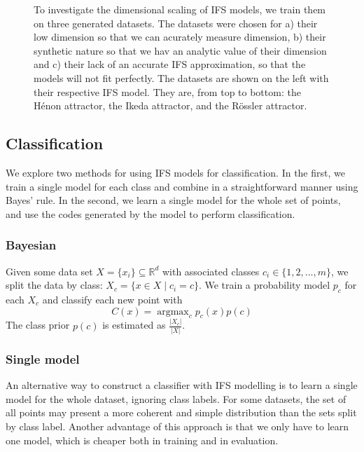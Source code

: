 \documentclass[10pt,a4paper,oneside]{article}
\theoremstyle{definition}
\DeclareMathOperator*{\argmax}{argmax}
\begin{document}
\begin{figure}[t]
\begin{subfigure}{0.33\textwidth}
\begin{tabular}{c c }
	\end{tabular}
  \end{subfigure}
  \caption{To investigate the dimensional scaling of IFS models, we train them on three generated datasets. The datasets were chosen for a) their low dimension so that we can acurately measure dimension, b) their synthetic nature so that we hav an analytic value of their dimension and c) their lack of an accurate IFS approximation, so that the models will not fit perfectly. The datasets are shown on the left with their respective IFS model. They are, from top to bottom: the H\'enon attractor, the Ikeda attractor, and the R\"ossler attractor.}
  \label{fig:dim_scale}
\end{figure}


\subsection*{Classification}

We explore two methods for using IFS models for classification. In the first, we train a single model for each class and combine in a straightforward manner using Bayes' rule. In the second, we learn a single model for the whole set of points, and use the codes generated by the model to perform classification.  

\subsubsection*{Bayesian}

Given some data set $X = \{x_i\} \subseteq {\mathbb R}^d$ with associated classes $c_i \in \{1, 2, \ldots, m\}$, we split the data by class: $X_c = \{ x \in X \mid c_i = c\}$. We train a probability model $p_c$ for each $X_c$ and classify each new point with
\[
C(x) = \argmax_{c} p_c(x) p(c)
\]
The class prior $p(c)$ is estimated as $\frac{|X_c|}{|X|}$.

\subsubsection*{Single model}

An alternative way to construct a classifier with IFS modelling is to learn a single model for the whole dataset, ignoring class labels. For some datasets, the set of all points may present a more coherent and simple distribution than the sets split by class label. Another advantage of this approach is that we only have to learn one model, which is cheaper both in training and in evaluation.
\end{document}
